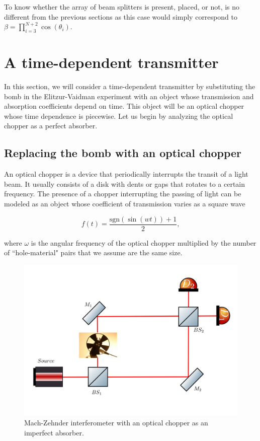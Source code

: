 \documentclass[12pt]{book}
\begin{document}
To know whether the array of beam splitters is present, placed, or not, is no different from the previous sections as this case would simply correspond to $\beta=\prod_{i=3}^{N+2} \cos(\theta_{i})$.


\section{A time-dependent transmitter}

In this section, we will consider a time-dependent transmitter by substituting the bomb in the Elitzur-Vaidman experiment with an object whose transmission and absorption coefficients depend on time. This object will be an optical chopper whose time dependence is piecewise. Let us begin by analyzing the optical chopper as a perfect absorber.

\subsection{Replacing the bomb with an optical chopper }
 

An optical chopper is a device that periodically interrupts the transit of a light beam. It usually consists of a disk with dents or gaps that rotates to a certain frequency. The presence of a chopper interrupting the passing of light can be modeled as an object whose coefficient of transmission  varies as a square wave  

\begin{equation}
f(t)=\frac{\mathrm{sgn}(\sin(wt))+1}{2},
\end{equation}

 where $\omega$ is the angular frequency of the optical chopper multiplied by the number of ``hole-material" pairs that we assume are the same size.

 \begin{figure}[h!]
\centering
\includegraphics[width=\linewidth]{images/machzenhderchopper.png}
\caption{Mach-Zehnder interferometer with an optical chopper as an imperfect absorber.}
\label{chopper}
\end{figure}
\end{document}
